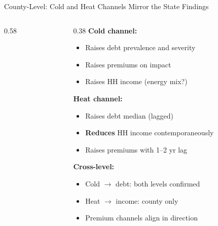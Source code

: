 \documentclass[aspectratio=169,11pt]{beamer}
\newcommand{\emphcolor}[1]{{\color{WarmOrange}\textbf{#1}}}
\newcommand{\tealtext}[1]{{\color{Teal}#1}}
\begin{document}
\begin{frame}{County-Level: Cold and Heat Channels Mirror the State Findings}
\begin{columns}[T]
\begin{column}{0.58\textwidth}
\begin{center}
      \end{center}
    \end{column}
    \begin{column}{0.38\textwidth}
      \scriptsize
      \textbf{Cold channel:}
      \begin{itemize}\itemsep0.05em
        \item Raises debt prevalence and severity
        \item Raises premiums on impact
        \item \tealtext{Raises} HH income (energy mix?)
      \end{itemize}
      \vspace{0.1em}
      \textbf{Heat channel:}
      \begin{itemize}\itemsep0.05em
        \item Raises debt median (lagged)
        \item \emphcolor{Reduces} HH income contemporaneously
        \item Raises premiums with 1--2 yr lag
      \end{itemize}
      \vspace{0.1em}
      \textbf{Cross-level:}
      \begin{itemize}\itemsep0.05em
        \item Cold $\to$ debt: both levels confirmed
        \item Heat $\to$ income: county only
        \item Premium channels align in direction
      \end{itemize}
    \end{column}
  \end{columns}
\end{frame}
\end{document}
